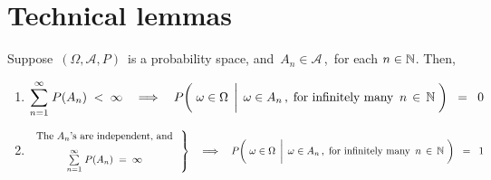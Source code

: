 

\section{Technical lemmas}
\setcounter{theorem}{0}
\setcounter{equation}{0}


\renewcommand{\theenumi}{\roman{enumi}}
\renewcommand{\labelenumi}{\textnormal{(\theenumi)}$\;\;$}


\begin{theorem}\label{theorem:BorelCantelli}
\mbox{}\vskip 0.1cm
\noindent
Suppose \,$(\Omega,\mathcal{A},P)$\, is a probability space, and
\,$A_{n} \in \mathcal{A}$\,,\, for each $n \in \mathbb{N}$.
Then,
\begin{enumerate}
\item
	\begin{equation*}
	\overset{\infty}{\underset{n=1}{\sum}}\;P(A_{n}) \; < \; \infty
	\quad\Longrightarrow\quad
		P\!\left(\,
			\left.
			\omega \in \overset{{\color{white}-}}{\Omega}
			\,\;\right\vert\;
			\omega \in A_{n}\,,\;\textnormal{for infinitely many \,$n\,\in\,\N$}
			\;\right)
		\;\; = \;\; 0
	\end{equation*}
\item
	\begin{equation*}
	\left.\begin{array}{c}
		\underset{{\color{white}-}}{\textnormal{The $A_{n}$'s are independent, and}}
		\\
	\overset{\infty}{\underset{n=1}{\sum}}\;P(A_{n}) \; = \; \infty
	\end{array}\;\right\}
	\quad\Longrightarrow\quad
		P\!\left(\,
			\left.
			\omega \in \overset{{\color{white}-}}{\Omega}
			\,\;\right\vert\;
			\omega \in A_{n}\,,\;\textnormal{for infinitely many \,$n\,\in\,\N$}
			\;\right)
		\;\; = \;\; 1
	\end{equation*}
\end{enumerate}
\end{theorem}
\proof
